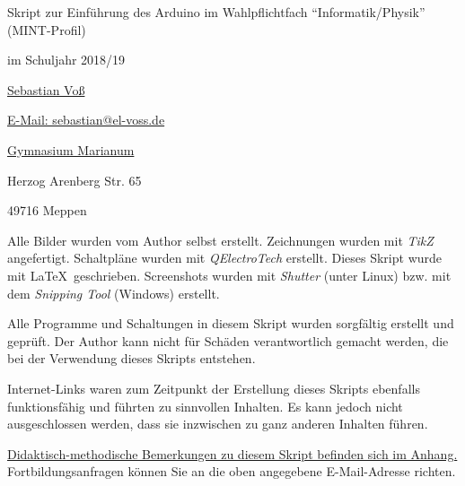 

	






\thispagestyle{empty}
\clearpage

\vspace{2\baselineskip}
Skript zur Einführung des Arduino im Wahlpflichtfach \enquote{Informatik/Physik} (MINT-Profil)

im Schuljahr 2018/19

\href{https://www.el-voss.de/}{Sebastian Voß}

\href{mailto:sebastian@el-voss.de}{E-Mail: sebastian@el-voss.de}

\vspace{2\baselineskip}

\href{http://marianum-meppen.de/}{Gymnasium Marianum}

Herzog Arenberg Str. 65

49716 Meppen

\vspace{2\baselineskip}

Alle Bilder wurden vom Author selbst erstellt. Zeichnungen wurden mit \emph{TikZ} angefertigt. Schaltpläne wurden mit \emph{QElectroTech} erstellt. Dieses Skript wurde mit \LaTeX ~geschrieben. Screenshots wurden mit \emph{Shutter} (unter Linux) bzw. mit dem \emph{Snipping Tool} (Windows) erstellt. 

\vspace{\baselineskip}
Alle Programme und Schaltungen in diesem Skript wurden sorgfältig erstellt und geprüft. Der Author kann nicht für Schäden verantwortlich gemacht werden, die bei der Verwendung dieses Skripts entstehen.

\vspace{\baselineskip}
Internet-Links waren zum Zeitpunkt der Erstellung dieses Skripts ebenfalls funktionsfähig und führten zu sinnvollen Inhalten. Es kann jedoch nicht ausgeschlossen werden, dass sie inzwischen zu ganz anderen Inhalten führen.
\vspace{2\baselineskip}

\hyperref[kap:didaktik]{Didaktisch-methodische Bemerkungen zu diesem Skript befinden sich im Anhang.} Fortbildungsanfragen können Sie an die oben angegebene E-Mail-Adresse richten.
\vspace{18\baselineskip}

